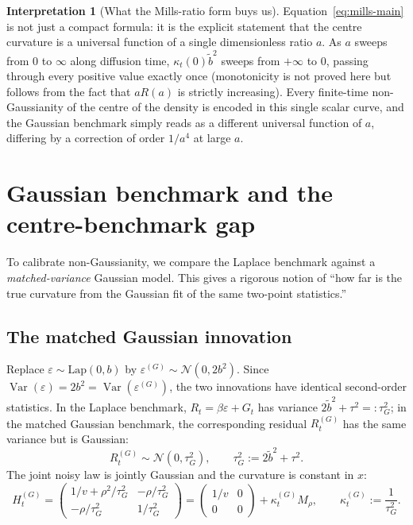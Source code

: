 \documentclass[11pt,a4paper,openany]{book}
\theoremstyle{plainserif}
\theoremstyle{definition}
\theoremstyle{remarkstyle}
\newtheorem*{interpretation}{Interpretation}
\newcommand{\V}{\operatorname{Var}}
\newcommand{\Normal}{\mathcal{N}}
\newcommand{\Lap}{\mathrm{Lap}}
\newcommand{\btilde}{\tilde{b}}
\newcommand{\mills}{R}
\begin{document}
\begin{interpretation}[What the Mills-ratio form buys us]
Equation~\eqref{eq:mills-main} is not just a compact formula: it is the
explicit statement that the centre curvature is a universal function of
a single dimensionless ratio $a$. As $a$ sweeps from $0$ to $\infty$
along diffusion time, $\kappa_t(0)\btilde^2$ sweeps from $+\infty$ to $0$,
passing through every positive value exactly once (monotonicity is not
proved here but follows from the fact that $a\mills(a)$ is strictly
increasing). Every finite-time non-Gaussianity of the centre of the
density is encoded in this single scalar curve, and the Gaussian
benchmark simply reads as a different universal function of $a$,
differing by a correction of order $1/a^4$ at large $a$.
\end{interpretation}

\chapter{Gaussian benchmark and the centre-benchmark gap}
\label{ch:benchmark}

To calibrate non-Gaussianity, we compare the Laplace benchmark against a
\emph{matched-variance} Gaussian model. This gives a rigorous notion of
``how far is the true curvature from the Gaussian fit of the same
two-point statistics.''

\section{The matched Gaussian innovation}

Replace $\varepsilon \sim \Lap(0,b)$ by $\varepsilon^{(G)} \sim \Normal(0, 2b^2)$.
Since $\V(\varepsilon) = 2b^2 = \V(\varepsilon^{(G)})$, the two innovations
have identical second-order statistics. In the Laplace benchmark,
$R_t = \beta\varepsilon + G_t$ has variance $2\btilde^2 + \tau^2 =: \tau_G^2$;
in the matched Gaussian benchmark, the corresponding residual
$R_t^{(G)}$ has the same variance but is Gaussian:
\begin{equation}
R_t^{(G)} \sim \Normal(0, \tau_G^2),\qquad \tau_G^2 := 2\btilde^2 + \tau^2.
\label{eq:tauG2}
\end{equation}
The joint noisy law is jointly Gaussian and the curvature is constant
in $x$:
\begin{equation}
H_t^{(G)} = \begin{pmatrix}1/v + \rho^2/\tau_G^2 & -\rho/\tau_G^2 \\
                         -\rho/\tau_G^2 & 1/\tau_G^2\end{pmatrix}
= \begin{pmatrix}1/v & 0\\ 0 & 0\end{pmatrix} + \kappa_t^{(G)} M_\rho,
\qquad
\kappa_t^{(G)} := \frac{1}{\tau_G^2}.
\label{eq:kappaG}
\end{equation}
\end{document}
